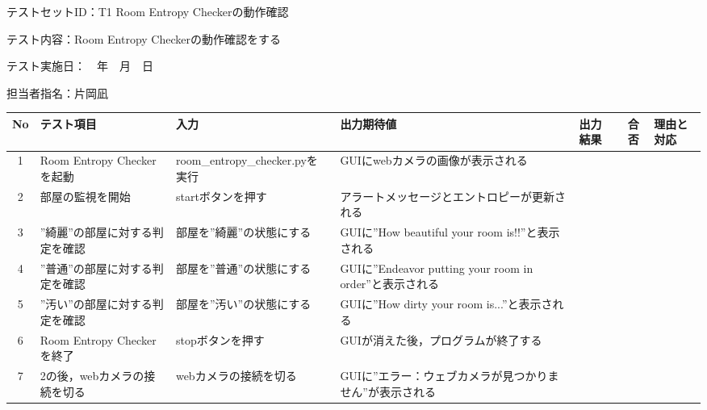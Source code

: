 テストセットID：T1 Room Entropy Checkerの動作確認

テスト内容：Room Entropy Checkerの動作確認をする

テスト実施日：　年　月　日

担当者指名：片岡凪


\begin{table}[H]
    \centering
    \begin{tabular}{|c|p{11em}|p{11em}|p{7em}|p{6em}|c|p{5em}|} \hline
        No & テスト項目 & 入力 & 出力期待値 & 出力結果 & 合否 & 理由と対応 \\ \hline
        1 & Room Entropy Checkerを起動 & room\_entropy\_checker.pyを実行 & GUIにwebカメラの画像が表示される &  &  & \\ \hline
        2 & 部屋の監視を開始 & startボタンを押す & アラートメッセージとエントロピーが更新される &  &  & \\ \hline
        3 & ”綺麗”の部屋に対する判定を確認 & 部屋を”綺麗”の状態にする & GUIに”How beautiful your room is!!”と表示される &  &  & \\ \hline
        4 & ”普通”の部屋に対する判定を確認 & 部屋を”普通”の状態にする & GUIに”Endeavor putting your room in order”と表示される &  &  & \\ \hline
        5 & ”汚い”の部屋に対する判定を確認 & 部屋を”汚い”の状態にする & GUIに”How dirty your room is...”と表示される &  &  & \\ \hline
        6 & Room Entropy Checkerを終了 & stopボタンを押す & GUIが消えた後，プログラムが終了する &  &  & \\ \hline
        7 & 2の後，webカメラの接続を切る & webカメラの接続を切る & GUIに”エラー：ウェブカメラが見つかりません”が表示される &  &  & \\ \hline
    \end{tabular}
    \label{tab:test_set1}
\end{table}